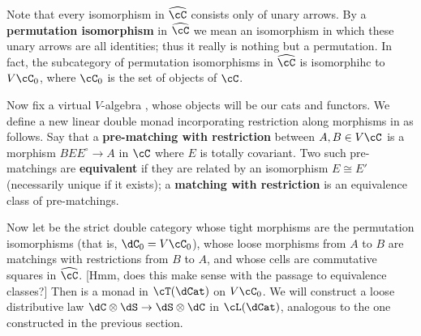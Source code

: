 \documentclass{amsart}
\let\ocomp\otimes
\newcommand{\C}{\cC}
\renewcommand{\Chat}{\ensuremath{\widehat{\C}}\xspace}
\renewcommand{\o}{^{\circ}}
\begin{document}
Note that every isomorphism in \Chat consists only of unary arrows.
By a \textbf{permutation isomorphism} in \Chat we mean an isomorphism in which these unary arrows are all identities; thus it really is nothing but a permutation.
In fact, the subcategory of permutation isomorphisms in $\Chat$ is isomorphihc to $V\C_0$, where $\C_0$ is the set of objects of $\C$.

Now fix a virtual $V$-algebra \C, whose objects will be our cats and functors.
We define a new linear double monad incorporating restriction along morphisms in \C as follows.
Say that a \textbf{pre-matching with restriction} between $A,B\in V\C$ is a morphism $B E E\o \to A$ in $\C$ where $E$ is totally covariant.
Two such pre-matchings are \textbf{equivalent} if they are related by an isomorphism $E\cong E'$ (necessarily unique if it exists); a \textbf{matching with restriction} is an equivalence class of pre-matchings.

Now let \dC be the strict double category whose tight morphisms are the permutation isomorphisms (that is, $\dC_0 = V\C_0$), whose loose morphisms from $A$ to $B$ are matchings with restrictions from $B$ to $A$, and whose cells are commutative squares in $\Chat$.
[Hmm, does this make sense with the passage to equivalence classes?]
Then \dC is a monad in $\cT(\dCat)$ on $V\C_0$.
We will construct a loose distributive law $\dC \ocomp \dS \to \dS\ocomp \dC$ in $\cL(\dCat)$, analogous to the one constructed in the previous section.
\end{document}
